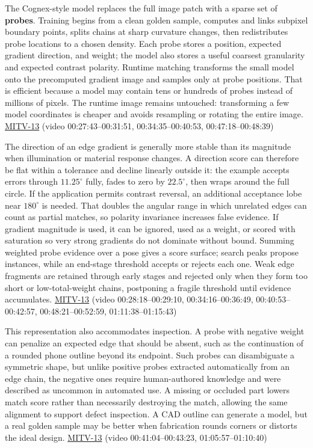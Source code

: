 The Cognex-style model replaces the full image patch with a sparse set of \textbf{probes}. Training begins from a clean golden sample, computes and links subpixel boundary points, splits chains at sharp curvature changes, then redistributes probe locations to a chosen density. Each probe stores a position, expected gradient direction, and weight; the model also stores a useful coarsest granularity and expected contrast polarity. Runtime matching transforms the small model onto the precomputed gradient image and samples only at probe positions. That is efficient because a model may contain tens or hundreds of probes instead of millions of pixels. The runtime image remains untouched: transforming a few model coordinates is cheaper and avoids resampling or rotating the entire image. \hyperref[04-visual-computing-ii-ch036-mitv-13---object-detection-recognition-and-pose-determination-patquick-us-7016539]{MITV-13} (video 00:27:43--00:31:51, 00:34:35--00:40:53, 00:47:18--00:48:39)

The direction of an edge gradient is generally more stable than its magnitude when illumination or material response changes. A direction score can therefore be flat within a tolerance and decline linearly outside it: the example accepts errors through \(11.25^\circ\) fully, fades to zero by \(22.5^\circ\), then wraps around the full circle. If the application permits contrast reversal, an additional acceptance lobe near \(180^\circ\) is needed. That doubles the angular range in which unrelated edges can count as partial matches, so polarity invariance increases false evidence. If gradient magnitude is used, it can be ignored, used as a weight, or scored with saturation so very strong gradients do not dominate without bound. Summing weighted probe evidence over a pose gives a score surface; search peaks propose instances, while an end-stage threshold accepts or rejects each one. Weak edge fragments are retained through early stages and rejected only when they form too short or low-total-weight chains, postponing a fragile threshold until evidence accumulates. \hyperref[04-visual-computing-ii-ch036-mitv-13---object-detection-recognition-and-pose-determination-patquick-us-7016539]{MITV-13} (video 00:28:18--00:29:10, 00:34:16--00:36:49, 00:40:53--00:42:57, 00:48:21--00:52:59, 01:11:38--01:15:43)

This representation also accommodates inspection. A probe with negative weight can penalize an expected edge that should be absent, such as the continuation of a rounded phone outline beyond its endpoint. Such probes can disambiguate a symmetric shape, but unlike positive probes extracted automatically from an edge chain, the negative ones require human-authored knowledge and were described as uncommon in automated use. A missing or occluded part lowers match score rather than necessarily destroying the match, allowing the same alignment to support defect inspection. A CAD outline can generate a model, but a real golden sample may be better when fabrication rounds corners or distorts the ideal design. \hyperref[04-visual-computing-ii-ch036-mitv-13---object-detection-recognition-and-pose-determination-patquick-us-7016539]{MITV-13} (video 00:41:04--00:43:23, 01:05:57--01:10:40)


